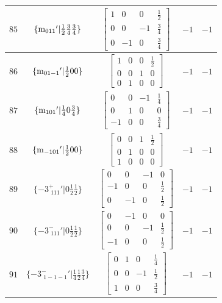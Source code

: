 \documentclass[fleqn,8pt]{jsarticle}
\begin{document}
\begin{longtable}{ccccc}
$ 85 $ & $ \{{\rm m}_{011}{}'|\frac{1}{2} \frac{3}{4} \frac{3}{4}\} $ & $ \begin{bmatrix} 1 & 0 & 0 & \frac{1}{2} \\ 0 & 0 & -1 & \frac{3}{4} \\ 0 & -1 & 0 & \frac{3}{4} \end{bmatrix} $ & $ -1 $ & $ -1 $ \\ \hline
$ 86 $ & $ \{{\rm m}_{01-1}{}'|\frac{1}{2} 0 0\} $ & $ \begin{bmatrix} 1 & 0 & 0 & \frac{1}{2} \\ 0 & 0 & 1 & 0 \\ 0 & 1 & 0 & 0 \end{bmatrix} $ & $ -1 $ & $ -1 $ \\ \hline
$ 87 $ & $ \{{\rm m}_{101}{}'|\frac{1}{4} 0 \frac{3}{4}\} $ & $ \begin{bmatrix} 0 & 0 & -1 & \frac{1}{4} \\ 0 & 1 & 0 & 0 \\ -1 & 0 & 0 & \frac{3}{4} \end{bmatrix} $ & $ -1 $ & $ -1 $ \\ \hline
$ 88 $ & $ \{{\rm m}_{-101}{}'|\frac{1}{2} 0 0\} $ & $ \begin{bmatrix} 0 & 0 & 1 & \frac{1}{2} \\ 0 & 1 & 0 & 0 \\ 1 & 0 & 0 & 0 \end{bmatrix} $ & $ -1 $ & $ -1 $ \\ \hline
$ 89 $ & $ \{-3^{+}_{\,\,111}{}'|0 \frac{1}{2} \frac{1}{2}\} $ & $ \begin{bmatrix} 0 & 0 & -1 & 0 \\ -1 & 0 & 0 & \frac{1}{2} \\ 0 & -1 & 0 & \frac{1}{2} \end{bmatrix} $ & $ -1 $ & $ -1 $ \\ \hline
$ 90 $ & $ \{-3^{-}_{\,\,111}{}'|0 \frac{1}{2} \frac{1}{2}\} $ & $ \begin{bmatrix} 0 & -1 & 0 & 0 \\ 0 & 0 & -1 & \frac{1}{2} \\ -1 & 0 & 0 & \frac{1}{2} \end{bmatrix} $ & $ -1 $ & $ -1 $ \\ \hline
$ 91 $ & $ \{-3^{-}_{\,\,1-1-1}{}'|\frac{1}{4} \frac{1}{2} \frac{3}{4}\} $ & $ \begin{bmatrix} 0 & 1 & 0 & \frac{1}{4} \\ 0 & 0 & -1 & \frac{1}{2} \\ 1 & 0 & 0 & \frac{3}{4} \end{bmatrix} $ & $ -1 $ & $ -1 $ \\ \hline

\end{longtable}
\end{document}
